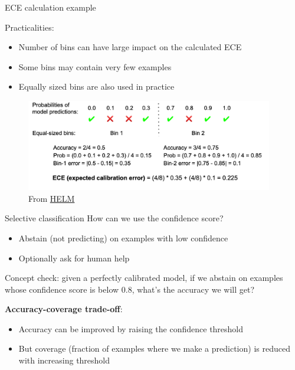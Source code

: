 \documentclass[usenames,dvipsnames,notes,11pt,aspectratio=169,hyperref={colorlinks=true, linkcolor=blue}]{beamer}
\begin{document}
\begin{frame}
    {ECE calculation example}

    Practicalities:\\
    \begin{itemize}
        \item Number of bins can have large impact on the calculated ECE\pause
        \item Some bins may contain very few examples 
        \item Equally sized bins are also used in practice
    \end{itemize}
    \pause

    \begin{figure}
        \includegraphics[height=4cm]{figures/ece-calc}
        \caption{From \href{https://arxiv.org/pdf/2211.09110.pdf}{HELM}}
    \end{figure}
\end{frame}

\begin{frame}
    {Selective classification}
    How can we use the confidence score?\\
    \begin{itemize}
    \item Abstain (not predicting) on examples with low confidence
        \item Optionally ask for human help
    \end{itemize}

    \pause
    Concept check: given a perfectly calibrated model, if we abstain on examples whose confidence score is below 0.8, what's the accuracy we will get?

    \pause
    \textbf{Accuracy-coverage trade-off}:\\
    \begin{itemize}
    \item Accuracy can be improved by raising the confidence threshold
    \item But coverage (fraction of examples where we make a prediction) is reduced with increasing threshold
    \end{itemize}
\end{frame}
\end{document}
